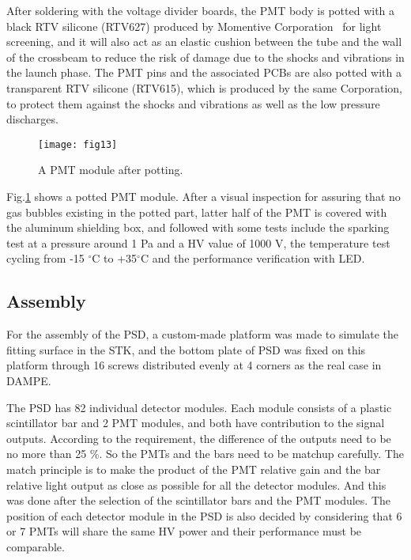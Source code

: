\documentclass[preprint]{elsarticle}
\begin{document}
After soldering with the voltage divider boards, the PMT body is potted with a black RTV silicone (RTV627) produced by Momentive Corporation~\cite{rtv} for light screening, and it will also act as an elastic cushion between the tube and the wall of the crossbeam to reduce the risk of damage due to the shocks and vibrations in the launch phase. The PMT pins and the associated PCBs are also potted with a transparent RTV silicone (RTV615), which is produced by the same Corporation, to protect them against the shocks and vibrations as well as the low pressure discharges.

\begin{figure}
 \centering
 \texttt{[image: fig13]}
\caption{A PMT module after potting.}
\label{fig:fig13}
\end{figure}

Fig.\ref{fig:fig13} shows a potted PMT module. After a visual inspection for assuring that no gas bubbles existing in the potted part, latter half of the PMT is covered with the aluminum shielding box, and followed with some tests include the sparking test at a pressure around 1 Pa and a HV value of 1000 V, the temperature test cycling from -15 $^{\circ}$C to +35$^{\circ}$C and the performance verification with LED.

\subsection{Assembly}

For the assembly of the PSD, a custom-made platform was made to simulate the fitting surface in the STK, and
the bottom plate of PSD was fixed on this platform through 16 screws distributed evenly at 4 corners as the real case in DAMPE.

The PSD has 82 individual detector modules. Each module consists of a plastic scintillator bar and 2 PMT modules, and both have contribution to the signal outputs. According to the requirement, the difference of the outputs need to be no more than  25 \%. So the PMTs and the bars need to be matchup carefully. The match principle is to make the product of the PMT relative gain and the bar relative light output as close as possible for all the detector modules. And this was done after the selection of the scintillator bars and the PMT modules.
The position of each detector module in the PSD is also decided by considering that 6 or 7 PMTs will share the same HV power and their performance must be comparable.
\end{document}
